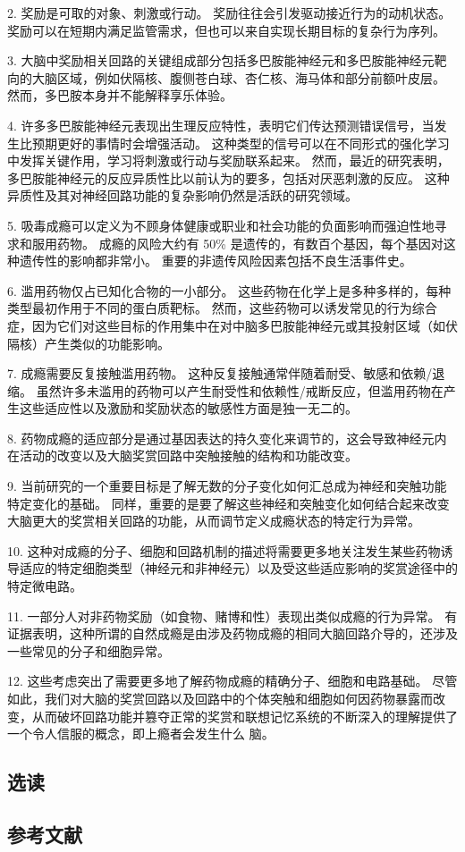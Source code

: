 2. 奖励是可取的对象、刺激或行动。 奖励往往会引发驱动接近行为的动机状态。 奖励可以在短期内满足监管需求，但也可以来自实现长期目标的复杂行为序列。 

3. 大脑中奖励相关回路的关键组成部分包括多巴胺能神经元和多巴胺能神经元靶向的大脑区域，例如伏隔核、腹侧苍白球、杏仁核、海马体和部分前额叶皮层。 然而，多巴胺本身并不能解释享乐体验。 

4. 许多多巴胺能神经元表现出生理反应特性，表明它们传达预测错误信号，当发生比预期更好的事情时会增强活动。 这种类型的信号可以在不同形式的强化学习中发挥关键作用，学习将刺激或行动与奖励联系起来。 然而，最近的研究表明，多巴胺能神经元的反应异质性比以前认为的要多，包括对厌恶刺激的反应。 这种异质性及其对神经回路功能的复杂影响仍然是活跃的研究领域。 

5. 吸毒成瘾可以定义为不顾身体健康或职业和社会功能的负面影响而强迫性地寻求和服用药物。 成瘾的风险大约有 50\% 是遗传的，有数百个基因，每个基因对这种遗传性的影响都非常小。 重要的非遗传风险因素包括不良生活事件史。 

6. 滥用药物仅占已知化合物的一小部分。 这些药物在化学上是多种多样的，每种类型最初作用于不同的蛋白质靶标。 然而，这些药物可以诱发常见的行为综合症，因为它们对这些目标的作用集中在对中脑多巴胺能神经元或其投射区域（如伏隔核）产生类似的功能影响。 

7. 成瘾需要反复接触滥用药物。 这种反复接触通常伴随着耐受、敏感和依赖/退缩。 虽然许多未滥用的药物可以产生耐受性和依赖性/戒断反应，但滥用药物在产生这些适应性以及激励和奖励状态的敏感性方面是独一无二的。 

8. 药物成瘾的适应部分是通过基因表达的持久变化来调节的，这会导致神经元内在活动的改变以及大脑奖赏回路中突触接触的结构和功能改变。 

9. 当前研究的一个重要目标是了解无数的分子变化如何汇总成为神经和突触功能特定变化的基础。 同样，重要的是要了解这些神经和突触变化如何结合起来改变大脑更大的奖赏相关回路的功能，从而调节定义成瘾状态的特定行为异常。 

10. 这种对成瘾的分子、细胞和回路机制的描述将需要更多地关注发生某些药物诱导适应的特定细胞类型（神经元和非神经元）以及受这些适应影响的奖赏途径中的特定微电路。

11. 一部分人对非药物奖励（如食物、赌博和性）表现出类似成瘾的行为异常。 有证据表明，这种所谓的自然成瘾是由涉及药物成瘾的相同大脑回路介导的，还涉及一些常见的分子和细胞异常。 

12. 这些考虑突出了需要更多地了解药物成瘾的精确分子、细胞和电路基础。 尽管如此，我们对大脑的奖赏回路以及回路中的个体突触和细胞如何因药物暴露而改变，从而破坏回路功能并篡夺正常的奖赏和联想记忆系统的不断深入的理解提供了一个令人信服的概念，即上瘾者会发生什么 脑。

\subsection{选读}
\subsection{参考文献}